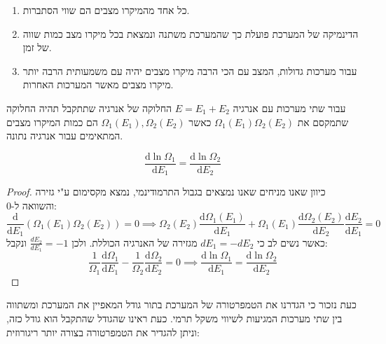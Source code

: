 \documentclass{tstextbook}
\begin{document}
\begin{enumerate}
  \item כל אחד מהמיקרו מצבים הם שווי הסתברות. 


  \item הדינמיקה של המערכת פועלת כך שהמערכת משתנה ונמצאת בכל מיקרו מצב כמות שווה של זמן. 


  \item עבור מערכות גדולות, המצב עם הכי הרבה מיקרו מצבים יהיה עם משמעותית הרבה יותר מיקרו מצבים מאשר המערכות האחרות. 


\end{enumerate}
\begin{corollary}
עבור שתי מערכות עם אנרגיה \(E = E_{1}+E_{2}\) החלוקה של אנרגיה שתתקבל תהיה החלוקה שתמקסם את \(\Omega_{1}(E_{1})\Omega_{2}(E_{2})\) כאשר \(\Omega_{1}(E_{1}),\Omega_{2}(E_{2})\) הם כמות המיקרו מצבים המתאימים עבור אנרגיה נתונה.

\end{corollary}
\begin{proposition}
$$\frac{\mathrm{d}\ln\Omega_{1}}{\mathrm{d}E_{1}}=\frac{\mathrm{d}\ln\Omega_{2}}{\mathrm{d}E_{2}}$$

\end{proposition}
\begin{proof}
כיוון שאנו מניחים שאנו נמצאים בגבול התרמודינמי, נמצא מקסימום ע"י גזירה והשוואה ל-0:
$$\frac{\mathrm{d}}{\mathrm{d}E_{1}}\left(\Omega_{1}(E_{1})\Omega_{2}(E_{2})\right)=0 \implies \Omega_{2}(E_{2})\frac{\mathrm{d}\Omega_{1}(E_{1})}{\mathrm{d}E_{1}}+\Omega_{1}(E_{1})\frac{\mathrm{d}\Omega_{2}(E_{2})}{\mathrm{d}E_{2}}\frac{\mathrm{d}E_{2}}{\mathrm{d}E_{1}}=0$$
כאשר נשים לב כי \(dE_{1}=-dE_{2}\) מגזירה של האנרגיה הכוללת. ולכן \(\frac{dE_{2}}{dE_{1}}=-1\) ונקבל:
$$\frac{1}{\Omega_{1}}\frac{\mathrm{d}\Omega_{1}}{\mathrm{d}E_{1}}-\frac{1}{\Omega_{2}}\frac{\mathrm{d}\Omega_{2}}{\mathrm{d}E_{2}}=0 \implies {\frac{\mathrm{d}\ln\Omega_{1}}{\mathrm{d}E_{1}}}={\frac{\mathrm{d}\ln\Omega_{2}}{\mathrm{d}E_{2}}}$$

\end{proof}
כעת נזכור כי הגדרנו את הטמפרטורה של המערכת בתור גודל המאפיין את המערכת ומשתווה בין שתי מערכות המגיעות לשיווי משקל תרמי. כעת ראינו שהגודל שהתקבל הוא גודל כזה, וניתן להגדיר את הטמפרטורה בצורה יותר ריגורוזית:
\end{document}
